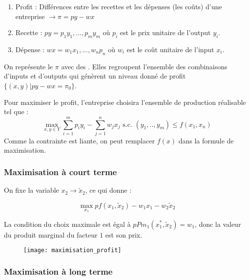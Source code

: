 \begin{enumerate}
\item Profit : Différences entre les recettes et les dépenses (les coûts) d'une entreprise $\rightarrow \pi = py - wx$
\item Recette : $py = p_1y_1, ..., p_my_m$ où $p_i$ est le prix unitaire de l'output $y_i$.
\item Dépense : $wx = w_1x_1, ..., w_n p_n$ où $w_i$ est le coût unitaire de l'input $x_i$.
\end{enumerate}

On représente le $\pi$ avec des . Elles regroupent l'ensemble des combinaisons d'inputs et d'outputs qui génèrent un niveau donné de profit $\{(x, y) | py - wx = \pi_0\}$.

Pour maximiser le profit, l'entreprise choisira l'ensemble de production réalisable tel que :
\begin{equation*}
\max_{x, y \in Y} \sum_{i = 1}^m p_i y_i - \sum_{j=1}^n w_j x_j \text{ s.c. } (y_1, .., y_m) \leq f(x_1, x_n)
\end{equation*}
Comme la contrainte est liante, on peut remplacer $f(x)$ dans la formule de maximisation.

\subsubsection{Maximisation à court terme}
On fixe la variable $x_2 \rightarrow \tilde{x}_2$, ce qui donne :

\begin{equation*}
\max_{x_1} p f(x_1,\tilde{x}_2) - w_1x_1 - w_2\tilde{x}_2
\end{equation*}

\newpage
La condition du choix maximale est égal à $pPm_1(x_1^*, \tilde{x}_2) = w_1$, donc la valeur du produit marginal du facteur $1$ est son prix.
\begin{figure}[H]
	\centering
	\texttt{[image: maximisation\_profit]}
\end{figure}

\subsubsection{Maximisation à long terme}

